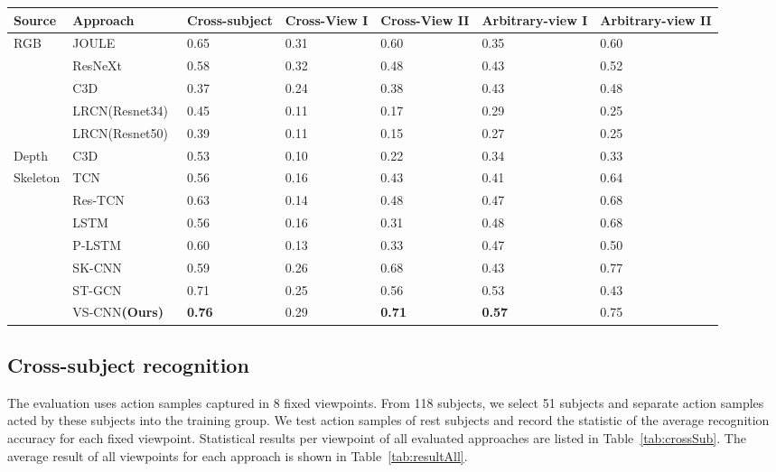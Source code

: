 \documentclass[journal]{IEEEtran}
\begin{document}
\begin{table*} \footnotesize \begin{center}
\caption{Results of four types of evaluations. All approaches perform better in the Cross-subject recognition than other evaluations because training and test samples have the same viewpoints. The result of cross-view II is a little worse than the cross-subject recognition. }
\label{tab:resultAll}
\begin{tabular}{|p{1cm}|p{2.3cm}|p{2cm}|p{2cm}|p{2cm}|p{2cm}|p{2cm}|}
\hline
Source & Approach & Cross-subject & Cross-View I  & Cross-View II  & Arbitrary-view I & Arbitrary-view II \\
\hline
\multirow{5}{*}{RGB} & JOULE~\cite{JOULE2016} & 0.65 & 0.31 & 0.60 & 0.35 & 0.60\\
 & ResNeXt~\cite{ResNeXtARX2018} & 0.58 & 0.32 & 0.48 & 0.43 & 0.52\\
 & C3D~\cite{C3DICCV2015} & 0.37 & 0.24 & 0.38 & 0.43 & 0.48 \\
 & LRCN(Resnet34)~\cite{LRCNCVPR2015}  & 0.45  &  0.11   &  0.17  & 0.29   & 0.25  \\
 & LRCN(Resnet50)~\cite{LRCNCVPR2015} & 0.39  & 0.11 &  0.15  & 0.27   & 0.25  \\
\hline
\multirow{1}{*}{Depth} & C3D~\cite{C3DICCV2015} & 0.53 & 0.10 & 0.22 & 0.34 & 0.33 \\
\hline
\multirow{7}{*}{Skeleton} & TCN~\cite{TCN2017} & 0.56 & 0.16 & 0.43 & 0.41 & 0.64\\
 & Res-TCN~\cite{ResTCN2017} & 0.63 & 0.14 &  0.48 & 0.47 & 0.68\\
 & LSTM~\cite{ShahroudyNTU2016} & 0.56 & 0.16 & 0.31 & 0.48 & 0.68 \\
 & P-LSTM~\cite{ShahroudyNTU2016} & 0.60 & 0.13 & 0.33 & 0.47 & 0.50 \\
 & SK-CNN~\cite{EnhancedSK2017} & 0.59 & 0.26 & 0.68 & 0.43 & 0.77\\
 & ST-GCN~\cite{STGCN2018} & 0.71 & 0.25 &  0.56 & 0.53 & 0.43 \\
 & VS-CNN\textbf{(Ours)} & \textbf{0.76} & 0.29  & \textbf{0.71} & \textbf{0.57} & 0.75\\
\hline
\end{tabular}
\end{center}
\end{table*}

\subsection{Cross-subject recognition}
The evaluation uses action samples captured in 8 fixed viewpoints. From 118 subjects, we select 51 subjects and separate action samples acted by these subjects into the training group. We test action samples of rest subjects and record the statistic of the average recognition accuracy for each fixed viewpoint. Statistical results per viewpoint of all evaluated approaches are listed in Table~\ref{tab:crossSub}. The average result of all viewpoints for each approach is shown in Table~\ref{tab:resultAll}.
\end{document}
